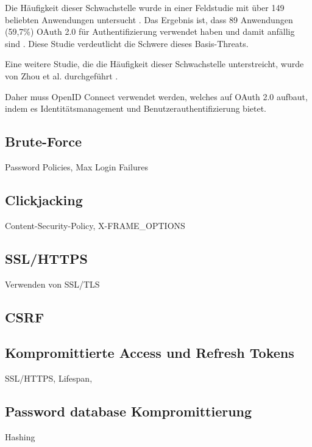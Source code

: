 Die Häufigkeit dieser Schwachstelle wurde in einer Feldstudie mit über 149 beliebten Anwendungen untersucht \cite{chen2014oauth}. Das Ergebnis ist, dass 89 Anwendungen (59,7\%) OAuth 2.0 für Authentifizierung verwendet haben und damit anfällig sind \cite{chen2014oauth}. Diese Studie verdeutlicht die Schwere dieses Basis-Threats.

Eine weitere Studie, die die Häufigkeit dieser Schwachstelle unterstreicht, wurde von Zhou et al. durchgeführt \cite{184435}.


Daher muss OpenID Connect verwendet werden, welches auf OAuth 2.0 aufbaut, indem es Identitätsmanagement und Benutzerauthentifizierung bietet.

\subsection{Brute-Force}

Password Policies, Max Login Failures

\subsection{Clickjacking}

Content-Security-Policy, X-FRAME\_OPTIONS

\subsection{SSL/HTTPS}

Verwenden von SSL/TLS

\subsection{CSRF}

\subsection{Kompromittierte Access und Refresh Tokens}

SSL/HTTPS, Lifespan, 

\subsection{Password database Kompromittierung}

Hashing

